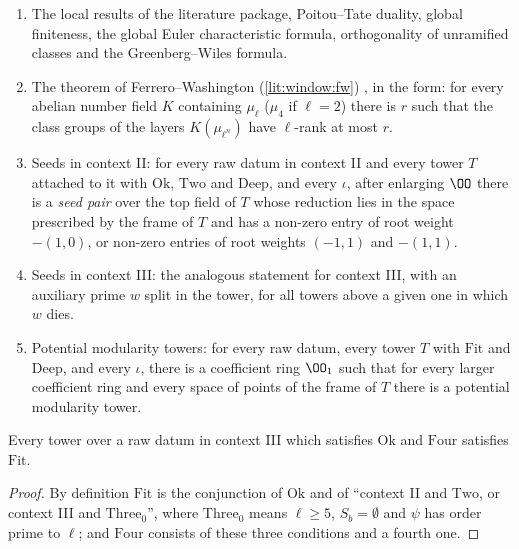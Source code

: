 \begin{definition}\label{pf:eis:spinputs}
\leavevmode
\begin{enumerate}[label=(I\arabic*)]
\item\label{pf:eis:I1} The local results of the literature package, Poitou--Tate duality, global finiteness, the
  global Euler characteristic formula, orthogonality of unramified classes and the Greenberg--Wiles formula.
\item\label{pf:eis:I2} The theorem of Ferrero--Washington (\cref{lit:window:fw}) \cite{FerreroWashington1979}, in the form: for every abelian
  number field $K$ containing $\mu_\ell$ ($\mu_4$ if $\ell=2$) there is $r$ such that the class groups of the layers $K(\mu_{\ell^n})$ have
  $\ell$-rank at most $r$.
\item\label{pf:eis:I3} Seeds in context II: for every raw datum in context II and every tower $T$ attached to it with $\mathrm{Ok}$, $\mathrm{Two}$
  and $\mathrm{Deep}$, and every $\iota$, after enlarging $\OO$ there is a \emph{seed pair} over the top field of $T$ whose reduction lies in the
  space prescribed by the frame of $T$ and has a non-zero entry of root weight $-(1,0)$, or non-zero entries of root weights $(-1,1)$ and
  $-(1,1)$.
\item\label{pf:eis:I4} Seeds in context III: the analogous statement for context III, with an auxiliary prime $w$ split in the tower, for all
  towers above a given one in which $w$ dies.
\item\label{pf:eis:I5} Potential modularity towers: for every raw datum, every tower $T$ with $\mathrm{Fit}$ and $\mathrm{Deep}$, and every $\iota$, there is a
  coefficient ring $\OO_1$ such that for every larger coefficient ring and every space of points of the frame of $T$ there is a potential
  modularity tower.
\end{enumerate}
\end{definition}

\begin{lemma}\label{pf:eis:hfit}
Every tower over a raw datum in context III which satisfies $\mathrm{Ok}$ and $\mathrm{Four}$ satisfies $\mathrm{Fit}$.
\end{lemma}

\begin{proof}
By definition $\mathrm{Fit}$ is the conjunction of $\mathrm{Ok}$ and of ``context II and $\mathrm{Two}$, or context III and $\mathrm{Three}_0$'', where
$\mathrm{Three}_0$ means $\ell\ge5$, $S_b=\emptyset$ and $\psi$ has order prime to $\ell$; and $\mathrm{Four}$ consists of these three conditions and
a fourth one.
\end{proof}


